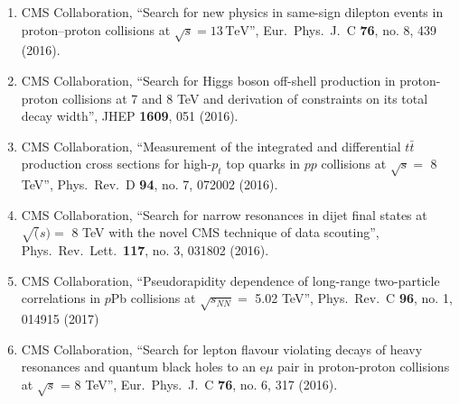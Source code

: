 \begin{enumerate}
\item CMS Collaboration, ``Search for new physics in same-sign dilepton events in proton–proton collisions at $\sqrt{s} = 13\,\text {TeV} $'', Eur.\ Phys.\ J.\ C {\bf 76}, no. 8, 439 (2016).

\item CMS Collaboration, ``Search for Higgs boson off-shell production in proton-proton collisions at 7 and 8 TeV and derivation of constraints on its total decay width'', JHEP {\bf 1609}, 051 (2016).

\item CMS Collaboration, ``Measurement of the integrated and differential $t \bar t$ production cross sections for high-$p_t$ top quarks in $pp$ collisions at $\sqrt s =$ 8 TeV'', Phys.\ Rev.\ D {\bf 94}, no. 7, 072002 (2016).

\item CMS Collaboration, ``Search for narrow resonances in dijet final states at $\sqrt(s)=$ 8 TeV with the novel CMS technique of data scouting'', Phys.\ Rev.\ Lett.\  {\bf 117}, no. 3, 031802 (2016).

\item CMS Collaboration, ``Pseudorapidity dependence of long-range two-particle correlations in $p$Pb collisions at $\sqrt {s_{NN}}=$ 5.02 TeV'', Phys.\ Rev.\ C {\bf 96}, no. 1, 014915 (2017)

\item CMS Collaboration, ``Search for lepton flavour violating decays of heavy resonances and quantum black holes to an e$\mu$ pair in proton-proton collisions at $\sqrt{s}$ = 8 TeV'', Eur.\ Phys.\ J.\ C {\bf 76}, no. 6, 317 (2016).


\end{enumerate}
